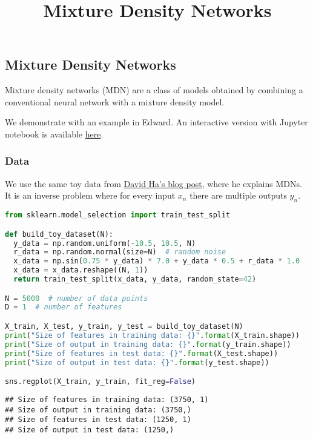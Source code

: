 \title{Mixture Density Networks}

\subsection{Mixture Density Networks}

Mixture density networks (MDN) \citep{bishop1994mixture} are a class
of models obtained by combining a conventional neural network with a
mixture density model.

We demonstrate with an example in Edward.
An interactive version with Jupyter notebook is available
\href{http://nbviewer.jupyter.org/github/blei-lab/edward/blob/master/notebooks/mixture_density_network.ipynb}{here}.

\subsubsection{Data}

We use the same toy data from
\href{http://blog.otoro.net/2015/11/24/mixture-density-networks-with-tensorflow/}{David
Ha's blog post}, where he explains MDNs. It is an inverse problem where
for every input $x_n$ there are multiple outputs $y_n$.

\begin{lstlisting}[language=Python]
from sklearn.model_selection import train_test_split

def build_toy_dataset(N):
  y_data = np.random.uniform(-10.5, 10.5, N)
  r_data = np.random.normal(size=N)  # random noise
  x_data = np.sin(0.75 * y_data) * 7.0 + y_data * 0.5 + r_data * 1.0
  x_data = x_data.reshape((N, 1))
  return train_test_split(x_data, y_data, random_state=42)

N = 5000  # number of data points
D = 1  # number of features

X_train, X_test, y_train, y_test = build_toy_dataset(N)
print("Size of features in training data: {}".format(X_train.shape))
print("Size of output in training data: {}".format(y_train.shape))
print("Size of features in test data: {}".format(X_test.shape))
print("Size of output in test data: {}".format(y_test.shape))

sns.regplot(X_train, y_train, fit_reg=False)
\end{lstlisting}

\begin{lstlisting}
## Size of features in training data: (3750, 1)
## Size of output in training data: (3750,)
## Size of features in test data: (1250, 1)
## Size of output in test data: (1250,)
\end{lstlisting}

